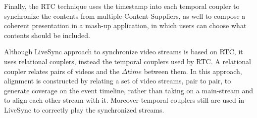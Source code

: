 Finally, the RTC technique uses the timestamp into each temporal coupler to synchronize the contents from multiple Content Suppliers, as well to compose a coherent presentation in a mash-up application, in which users can choose what contents should be included.

Although LiveSync approach to synchronize video streams is based on RTC, it uses relational couplers, instead the temporal couplers used by RTC. A relational coupler relates pairs of videos and the $\Delta{time}$ between them. In this approach, alignment is constructed by relating a set of video streams, pair to pair, to generate coverage on the event timeline, rather than taking on a main-stream and to align each other stream with it. Moreover temporal couplers still are used in LiveSync to correctly play the synchronized streams.









